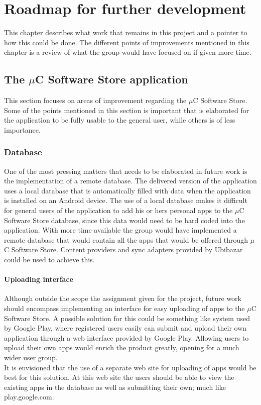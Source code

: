 \chapter{Roadmap for further development}
This chapter describes what work that remains in this project and a pointer to how this could be done. The different points of improvements mentioned in this chapter is a review of what the group would have focused on if given more time.

\section{The $\mu$C Software Store application}
This section focuses on areas of improvement regarding the $\mu$C Software Store. Some of the points mentioned in this section is important that is elaborated for the application to be fully usable to the general user, while others is of less importance.

	\subsection{Database}
	One of the most pressing matters that needs to be elaborated in future work is the implementation of a remote database. The delivered version of the application uses a local database that is automatically filled with data when the application is installed on an Android device. The use of a local database makes it difficult for general users of the application to add his or hers personal apps to the $\mu$C Software Store database, since this data would need to be hard coded into the application. With more time available the group would have implemented a remote database that would contain all the apps that would be offered through $\mu$C Software Store. Content providers and sync adapters provided by Ubibazar could be used to achieve this.

	\subsubsection{Uploading interface}
	Although outside the scope the assignment given for the project, future work should encompass implementing an interface for easy uploading of apps to the $\mu$C Software Store. A possible solution for this could be something like system used by Google Play, where registered users easily can submit and upload their own application through a web interface provided by Google Play. Allowing users to upload their own apps would enrich the product greatly, opening for a much wider user group.\\
	\newline
	It is envisioned that the use of a separate web site for uploading of apps would be best for this solution. At this web site the users should be able to view the existing apps in the database as well as submitting their own; much like play.google.com.

